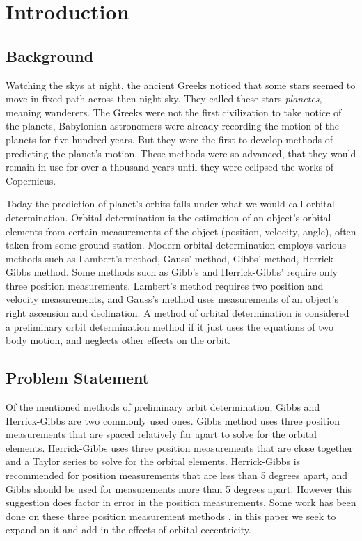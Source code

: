 \documentclass[12pt]{article}
\begin{document}
	\newpage

	\section{Introduction}
	\subsection{Background}
	Watching the skys at night, the ancient Greeks noticed that some stars seemed to move in fixed path across then night sky. They called these stars \textit{planetes}, meaning wanderers. The Greeks were not the first civilization to take notice of the planets, Babylonian astronomers were already recording the motion of the planets for five hundred years. But they were the first to develop methods of predicting the planet's motion. These methods were so advanced, that they would remain in use for over a thousand years until they were eclipsed the works of Copernicus\cite{lectureOnGreekAstro}. %
	
	Today the prediction of planet's orbits falls under what we would call orbital determination. Orbital determination is the estimation of an object's orbital elements from certain measurements of the object (position, velocity, angle), often taken from some ground station. Modern orbital determination employs various methods such as Lambert's method, Gauss' method, Gibbs' method, Herrick-Gibbs method. Some methods such as Gibb's and Herrick-Gibbs' require only three position measurements. Lambert's method requires two position and velocity measurements, and Gauss's method uses measurements of an object's right ascension and declination. A method of orbital determination is considered a preliminary orbit determination method if it just uses the equations of two body motion, and neglects other effects on the orbit.\par 
	
	
	
		\subsection{Problem Statement}
		Of the mentioned methods of preliminary orbit determination, Gibbs and Herrick-Gibbs are two commonly used ones. Gibbs method uses three position measurements that are spaced relatively far apart to solve for the orbital elements. Herrick-Gibbs uses three position measurements that are close together and a Taylor series to solve for the orbital elements. Herrick-Gibbs is recommended for position measurements that are less than 5 degrees apart, and Gibbs should be used for measurements more than 5 degrees apart\cite{vallado2007fundamentals}. However this suggestion does factor in error in the position measurements. Some work has been done on these three position measurement methods \cite{Kaushick}, in this paper we seek to expand on it and add in the effects of orbital eccentricity.
\end{document}
